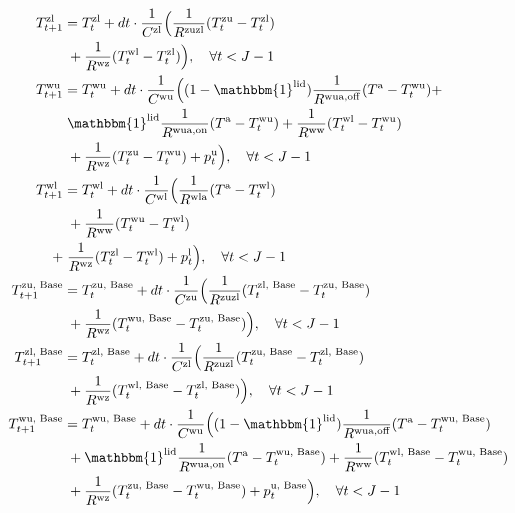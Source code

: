 \documentclass[conference]{IEEEtran}
\begin{document}
\begin{subequations}
\begin{align}
        T^{\text{zl}}_{t+1} & = T^{\text{zl}}_{t} + dt \cdot \frac{1}{C^{\text{zl}}}\Bigl( \frac{1}{R^{\text{zuzl}}} (T^{\text{zu}}_{t} - T^{\text{zl}}_{t}) \notag                                     \\ & \mspace{5mu} + \frac{1}{R^{\text{wz}}} (T^{\text{wl}}_{t} - T^{\text{zl}}_{t}) \Bigr), \quad \forall{t} < J-1 \label{P2:StateSpace2} \\
        T^{\text{wu}}_{t+1} & = T^{\text{wu}}_{t} + dt \cdot \frac{1}{C^{\text{wu}}}\Bigl( (1-\mathbbm{1}^{\text{lid}}) \frac{1}{R^{\text{wua},\text{off}}} (T^{\text{a}} - T^{\text{wu}}_{t}) \notag + \\ & \mspace{5mu} \mathbbm{1}^{\text{lid}} \frac{1}{R^{\text{wua},\text{on}}} (T^{\text{a}} - T^{\text{wu}}_{t}) + \frac{1}{R^{\text{ww}}} (T^{\text{wl}}_{t} - T^{\text{wu}}_{t}) \notag \\ & \mspace{5mu} + \frac{1}{R^{\text{wz}}} (T^{\text{zu}}_{t} - T^{\text{wu}}_{t}) + p^{\text{u}}_{t} \Bigr), \quad \forall{t} < J-1 \label{P2:StateSpace3} \\
        T^{\text{wl}}_{t+1} & = T^{\text{wl}}_{t} + dt \cdot \frac{1}{C^{\text{wl}}}\Bigl( \frac{1}{R^{\text{wla}}} (T^{\text{a}} - T^{\text{wl}}_{t}) \notag                                           \\ & \mspace{5mu} + \frac{1}{R^{\text{ww}}} (T^{\text{wu}}_{t} - T^{\text{wl}}_{t})  \notag \\
        + & \mspace{5mu} \frac{1}{R^{\text{wz}}} (T^{\text{zl}}_{t} - T^{\text{wl}}_{t}) + p^{\text{l}}_{t} \Bigr), \quad \forall{t} < J-1 \label{P2:StateSpace4} \\
        T^{\text{zu, Base}}_{t+1} & = T^{\text{zu, Base}}_{t} + dt \cdot \frac{1}{C^{\text{zu}}}\Bigl( \frac{1}{R^{\text{zuzl}}} (T^{\text{zl, Base}}_{t} - T^{\text{zu, Base}}_{t}) \notag                                     \\ & \mspace{5mu} + \frac{1}{R^{\text{wz}}} (T^{\text{wu, Base}}_{t} - T^{\text{zu, Base}}_{t}) \Bigr), \quad \forall{t} < J-1 \label{P2:StateSpaceBase1} \\
        T^{\text{zl, Base}}_{t+1} & = T^{\text{zl, Base}}_{t} + dt \cdot \frac{1}{C^{\text{zl}}}\Bigl( \frac{1}{R^{\text{zuzl}}} (T^{\text{zu, Base}}_{t} - T^{\text{zl, Base}}_{t}) \notag                                     \\ & \mspace{5mu} + \frac{1}{R^{\text{wz}}} (T^{\text{wl, Base}}_{t} - T^{\text{zl, Base}}_{t}) \Bigr), \quad \forall{t} < J-1 \label{P2:StateSpaceBase2} \\
        T^{\text{wu, Base}}_{t+1} & = T^{\text{wu, Base}}_{t} + dt \cdot \frac{1}{C^{\text{wu}}}\Bigl( (1-\mathbbm{1}^{\text{lid}}) \frac{1}{R^{\text{wua},\text{off}}} (T^{\text{a}} - T^{\text{wu, Base}}_{t}) \notag  \\ & \mspace{5mu} + \mathbbm{1}^{\text{lid}} \frac{1}{R^{\text{wua},\text{on}}} (T^{\text{a}} - T^{\text{wu, Base}}_{t}) + \frac{1}{R^{\text{ww}}} (T^{\text{wl, Base}}_{t} - T^{\text{wu, Base}}_{t}) \notag \\ & \mspace{5mu} + \frac{1}{R^{\text{wz}}} (T^{\text{zu, Base}}_{t} - T^{\text{wu, Base}}_{t}) + p^{\text{u, Base}}_{t} \Bigr), \quad \forall{t} < J-1 \label{P2:StateSpaceBase3} \\

\end{align}
\end{subequations}
\end{document}
